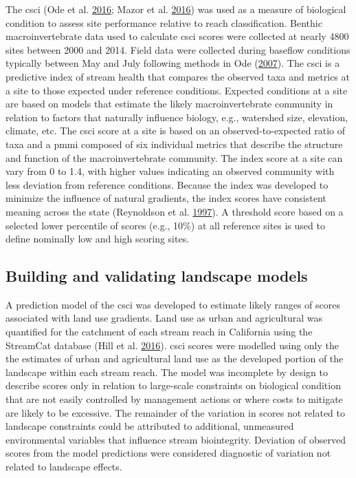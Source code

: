\documentclass[]{article}
\begin{document}
The \ac{csci} (Ode et al. \protect\hyperlink{ref-Ode16}{2016}; Mazor et
al. \protect\hyperlink{ref-Mazor16}{2016}) was used as a measure of
biological condition to assess site performance relative to reach
classification. Benthic macroinvertebrate data used to calculate
\ac{csci} scores were collected at nearly 4800 sites between 2000 and
2014. Field data were collected during baseflow conditions typically
between May and July following methods in Ode
(\protect\hyperlink{ref-Ode07}{2007}). The \ac{csci} is a predictive
index of stream health that compares the observed taxa and metrics at a
site to those expected under reference conditions. Expected conditions
at a site are based on models that estimate the likely macroinvertebrate
community in relation to factors that naturally influence biology, e.g.,
watershed size, elevation, climate, etc. The \ac{csci} score at a site
is based on an observed-to-expected ratio of taxa and a \ac{pmmi}
composed of six individual metrics that describe the structure and
function of the macroinvertebrate community. The index score at a site
can vary from 0 to 1.4, with higher values indicating an observed
community with less deviation from reference conditions. Because the
index was developed to minimize the influence of natural gradients, the
index scores have consistent meaning across the state (Reynoldson et al.
\protect\hyperlink{ref-Reynoldson97}{1997}). A threshold score based on
a selected lower percentile of scores (e.g., 10\%) at all reference
sites is used to define nominally low and high scoring sites.

\subsection{Building and validating landscape
models}\label{building-and-validating-landscape-models}

A prediction model of the \ac{csci} was developed to estimate likely
ranges of scores associated with land use gradients. Land use as urban
and agricultural was quantified for the catchment of each stream reach
in California using the StreamCat database (Hill et al.
\protect\hyperlink{ref-Hill16}{2016}). \ac{csci} scores were modelled
using only the the estimates of urban and agricultural land use as the
developed portion of the landscape within each stream reach. The model
was incomplete by design to describe scores only in relation to
large-scale constraints on biological condition that are not easily
controlled by management actions or where costs to mitigate are likely
to be excessive. The remainder of the variation in scores not related to
landscape constraints could be attributed to additional, unmeasured
environmental variables that influence stream biointegrity. Deviation of
observed scores from the model predictions were considered diagnostic of
variation not related to landscape effects.
\end{document}
